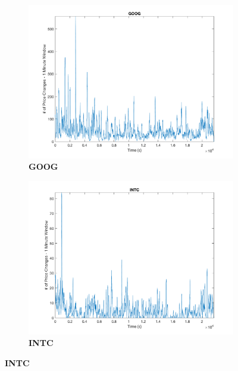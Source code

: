 \begin{figure}[htbp]
\vspace{3mm}

\begin{subfigure}[t]{0.49\textwidth}
\captionsetup{labelformat=empty}

\caption{\textbf{GOOG}}
\includegraphics[width=\textwidth, trim = 0 0 0 30, clip]{Cluster_Plots/GOOG_cluster.png}

\end{subfigure}
\begin{subfigure}[t]{0.49\textwidth}
\captionsetup{labelformat=empty}

\caption{\textbf{INTC}}
\includegraphics[width=\textwidth, trim = 0 0 0 30, clip]{Cluster_Plots/INTC_cluster.png}
\end{subfigure}


\end{figure}
